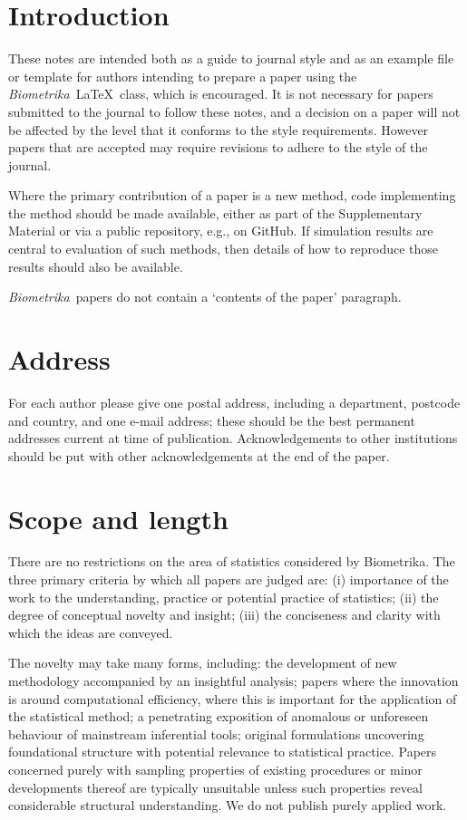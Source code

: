 \documentclass[lineno]{biometrika}
\def\Bka{{\it Biometrika}}
\begin{document}
\section{Introduction}

These notes are intended both as a guide to journal style and as an example file or template for authors intending to prepare a paper using  the \Bka\ \LaTeX\ class, which is encouraged.  It is not necessary for papers submitted to the journal to follow these notes, and a decision on a paper will not be affected by the level that it conforms to the style requirements. However papers that are accepted may require revisions to adhere to the style of the journal.

Where the primary contribution of a paper is a new method, code implementing the method should be made available, either as part of the Supplementary Material or via a public repository, e.g., on GitHub. If simulation results are central to evaluation of such methods, then details of how to reproduce those results should also be available. 

\Bka\  papers do not contain a `contents of the paper' paragraph.

\section{Address}

For each author please give one postal address, including a department, postcode and country, and one e-mail address; these should be the best permanent addresses current at time of publication. Acknowledgements to other institutions should be put with other acknowledgements at the end of the paper. 

\section{Scope and length}

There are no restrictions on the area of statistics considered by Biometrika. The three
primary criteria by which all papers are judged are:
(i) importance of the work to the understanding, practice or potential practice of statistics;
(ii) the degree of conceptual novelty and insight;
(iii) the conciseness and clarity with which the ideas are conveyed.

The novelty may take many forms, including: the development of new methodology
accompanied by an insightful analysis; papers where the innovation is around computational
efficiency, where this is important for the application of the statistical method; a penetrating
exposition of anomalous or unforeseen behaviour of mainstream inferential tools; original
formulations uncovering foundational structure with potential relevance to statistical
practice. Papers concerned purely with sampling properties of existing procedures or minor
developments thereof are typically unsuitable unless such properties reveal considerable
structural understanding. We do not publish purely applied work.
\end{document}
